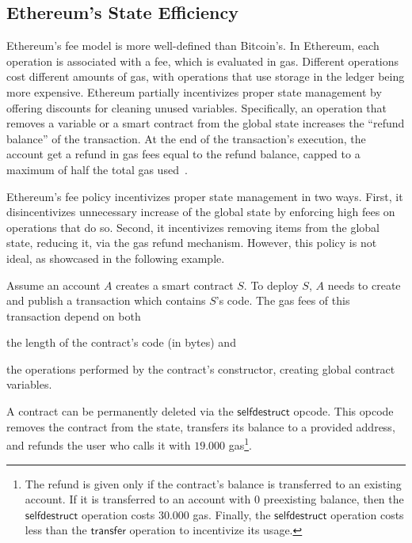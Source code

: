 \subsection{Ethereum's State Efficiency}\label{sec:ethereum-fees}

Ethereum's fee model is more well-defined than Bitcoin's. In Ethereum, each
operation is associated with a fee, which is evaluated in gas. Different
operations cost different amounts of gas, with operations that use storage in
the ledger being more expensive.  Ethereum partially incentivizes proper state
management by offering discounts for cleaning unused variables. Specifically,
an operation that removes a variable or a smart contract from the global state
increases the ``refund balance'' of the transaction. At the end of the
transaction's execution, the account get a refund in gas fees equal to the
refund balance, capped to a maximum of half the total gas
used~\cite{wood2014ethereum}.

Ethereum's fee policy incentivizes proper state management in two ways.  First,
it disincentivizes unnecessary increase of the global state by enforcing high
fees on operations that do so. Second, it incentivizes removing items from the
global state, \ie reducing it, via the gas refund mechanism. However, this
policy is not ideal, as showcased in the following example.

Assume an account $A$ creates a smart contract $S$. To deploy $S$, $A$ needs to
create and publish a transaction which contains $S$'s code. The gas fees of
this transaction depend on both
\begin{inparaenum}[a)]
    \item the length of the contract's code (in bytes) and
    \item the operations performed by the contract's constructor, \eg creating
        global contract variables.
\end{inparaenum}

A contract can be permanently deleted via the $\mathsf{selfdestruct}$ opcode.
This opcode removes the contract from the state, transfers its balance to a
provided address, and refunds the user who calls it with $19.000$
gas\footnote{The refund is given only if the contract's balance is transferred
to an existing account. If it is transferred to an account with $0$ preexisting
balance, then the $\mathsf{selfdestruct}$ operation costs $30.000$ gas.
Finally, the $\mathsf{selfdestruct}$ operation costs less than the
$\mathsf{transfer}$ operation to incentivize its usage.}.

